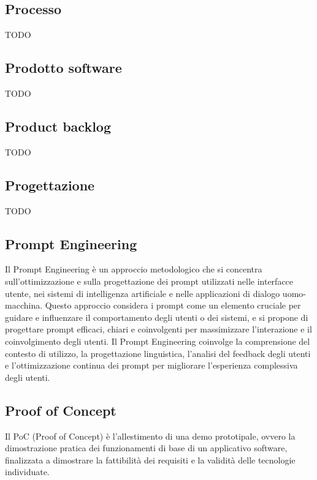 \vspace{2em}
\subsection*{Processo}
TODO

\vspace{2em}
\subsection*{Prodotto software}
TODO

\vspace{2em}
\subsection*{Product backlog}
TODO

\vspace{2em}
\subsection*{Progettazione}
TODO

\vspace{2em}
\subsection*{Prompt Engineering}
Il Prompt Engineering è un approccio metodologico che si concentra sull'ottimizzazione e sulla progettazione dei prompt utilizzati nelle interfacce utente, nei sistemi di intelligenza artificiale e nelle applicazioni di dialogo uomo-macchina. Questo approccio considera i prompt come un elemento cruciale per guidare e influenzare il comportamento degli utenti o dei sistemi, e si propone di progettare prompt efficaci, chiari e coinvolgenti per massimizzare l'interazione e il coinvolgimento degli utenti. Il Prompt Engineering coinvolge la comprensione del contesto di utilizzo, la progettazione linguistica, l'analisi del feedback degli utenti e l'ottimizzazione continua dei prompt per migliorare l'esperienza complessiva degli utenti.

\vspace{2em}
\subsection*{Proof of Concept}
Il PoC (Proof of Concept) è l’allestimento di una demo prototipale, ovvero la dimostrazione pratica dei funzionamenti di base di un applicativo software, finalizzata a dimostrare la fattibilità dei requisiti e la validità delle tecnologie individuate.

